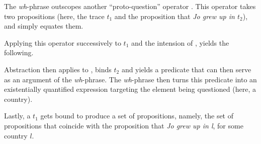 \begin{exe}
\end{exe}

The \textit{wh}-phrase outscopes another ``proto-question'' operator \citep{Karttunen1977}. This operator takes two propositions (here, the trace $t_1$ and the proposition that \textit{Jo grew up in $t_2$}), and simply equates them. 

\begin{exe}
\end{exe}

Applying this operator successively to $t_1$ and the intension of , yields the following.

\begin{exe}
\end{exe}

Abstraction then applies to , binds $t_2$ and yields a predicate that can then serve as an argument of the \textit{wh}-phrase. The \textit{wh}-phrase then turns this predicate into an existentially quantified expression targeting the element being questioned (here, a country).

\begin{exe}
\end{exe}

Lastly, a $t_1$ gets bound to produce a set of propositions, namely, the set of propositions that coincide with the proposition that \textit{Jo grew up in l}, for some country $l$. 

\begin{exe}
\end{exe}


